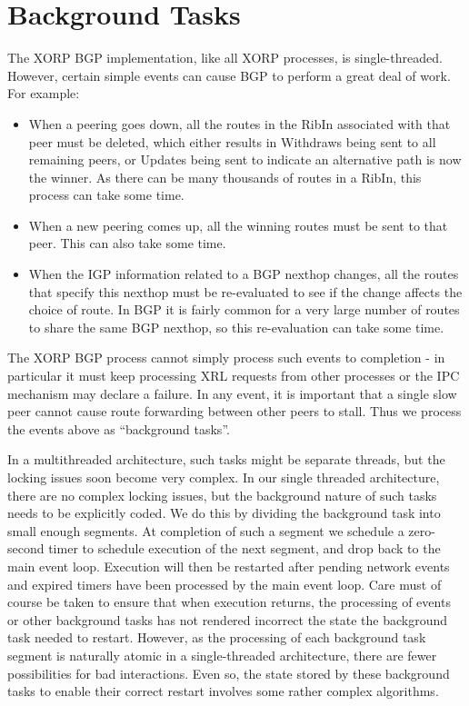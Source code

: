 \documentclass[11pt]{article}
\begin{document}
\section{Background Tasks}

The XORP BGP implementation, like all XORP processes, is
single-threaded.  However, certain simple events can cause BGP to
perform a great deal of work.  For example:
\begin{itemize}
\item When a peering goes down, all the routes in the RibIn associated
with that peer must be deleted, which either results in Withdraws
being sent to all remaining peers, or Updates being sent to indicate
an alternative path is now the winner.  As there can be many thousands
of routes in a RibIn, this process can take some time.
\item When a new peering comes up, all the winning routes must be sent
to that peer.  This can also take some time.
\item When the IGP information related to a BGP nexthop changes, all
the routes that specify this nexthop must be re-evaluated to see if
the change affects the choice of route.  In BGP it is fairly common
for a very large number of routes to share the same BGP nexthop, so
this re-evaluation can take some time.
\end{itemize}
The XORP BGP process cannot simply process such events to completion -
in particular it must keep processing XRL requests from other
processes or the IPC mechanism may declare a failure.  In any event,
it is important that a single slow peer cannot cause route forwarding
between other peers to stall.  Thus we process the events above as
``background tasks''.  

In a multithreaded architecture, such tasks might be separate threads,
but the locking issues soon become very complex.  In our single
threaded architecture, there are no complex locking issues, but the
background nature of such tasks needs to be explicitly coded.  We do
this by dividing the background task into small enough segments.  At
completion of such a segment we schedule a zero-second timer to
schedule execution of the next segment, and drop back to the main
event loop.  Execution will then be restarted after pending network
events and expired timers have been processed by the main event loop.
Care must of course be taken to ensure that when execution returns,
the processing of events or other background tasks has not rendered
incorrect the state the background task needed to restart.  However,
as the processing of each background task segment is naturally atomic
in a single-threaded architecture, there are fewer possibilities for
bad interactions.  Even so, the state stored by these background tasks
to enable their correct restart involves some rather complex
algorithms.
\end{document}
